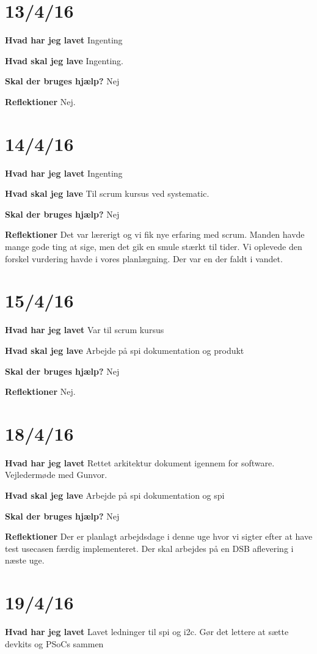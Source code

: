 \documentclass{article}
\begin{document}
	\section{13/4/16}
	\textbf{Hvad har jeg lavet}
	Ingenting
	
	\textbf{Hvad skal jeg lave}
	Ingenting.
	
	\textbf{Skal der bruges hjælp?}
	Nej
	
	\textbf{Reflektioner}
	Nej.
	
	\section{14/4/16}
	\textbf{Hvad har jeg lavet}
	Ingenting
	
	\textbf{Hvad skal jeg lave}
	Til scrum kursus ved systematic.
	
	\textbf{Skal der bruges hjælp?}
	Nej
	
	\textbf{Reflektioner}
	Det var lærerigt og vi fik nye erfaring med scrum. Manden havde mange gode ting at sige, men det gik en smule stærkt til tider. Vi oplevede den forskel vurdering havde i vores planlægning. Der var en der faldt i vandet. 
	
	\section{15/4/16}
	\textbf{Hvad har jeg lavet}
	Var til scrum kursus
	
	\textbf{Hvad skal jeg lave}
	Arbejde på spi dokumentation og produkt
	
	\textbf{Skal der bruges hjælp?}
	Nej
	
	\textbf{Reflektioner}
	Nej.
	
	\section{18/4/16}
	\textbf{Hvad har jeg lavet}
	Rettet arkitektur dokument igennem for software. Vejledermøde med Gunvor.
	
	\textbf{Hvad skal jeg lave}
	Arbejde på spi dokumentation og spi
	
	\textbf{Skal der bruges hjælp?}
	Nej
	
	\textbf{Reflektioner}
	Der er planlagt arbejdsdage i denne uge hvor vi sigter efter at have test usecasen færdig implementeret. Der skal arbejdes på en DSB aflevering i næste uge.
	
	\section{19/4/16}
	\textbf{Hvad har jeg lavet}
	Lavet ledninger til spi og i2c. Gør det lettere at sætte devkits og PSoCs sammen
	
\end{document}
